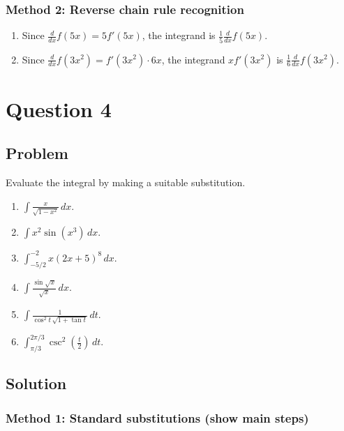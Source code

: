 \documentclass[12pt]{article}
\begin{document}
\subsubsection*{Method 2: Reverse chain rule recognition}

\begin{enumerate}[label=(\roman*)]
\item Since \(\frac{d}{dx}f(5x)=5f'(5x)\), the integrand is \(\frac{1}{5}\frac{d}{dx}f(5x)\).

\item Since \(\frac{d}{dx}f(3x^2)=f'(3x^2)\cdot 6x\), the integrand \(x f'(3x^2)\) is \(\frac{1}{6}\frac{d}{dx}f(3x^2)\).
\end{enumerate}

\bigskip


\newpage

\section*{Question 4}

\subsection*{Problem}

Evaluate the integral by making a suitable substitution.
\begin{enumerate}[label=(\roman*)]
\item \(\displaystyle \int \frac{x}{\sqrt{1-x^2}}\,dx.\)
\item \(\displaystyle \int x^2\sin(x^3)\,dx.\)
\item \(\displaystyle \int_{-5/2}^{-2} x(2x+5)^8\,dx.\)
\item \(\displaystyle \int \frac{\sin\sqrt{x}}{\sqrt{x}}\,dx.\)
\item \(\displaystyle \int \frac{1}{\cos^2 t\,\sqrt{1+\tan t}}\,dt.\)
\item \(\displaystyle \int_{\pi/3}^{2\pi/3}\csc^2\!\left(\frac{t}{2}\right)\,dt.\)
\end{enumerate}

\subsection*{Solution}

\subsubsection*{Method 1: Standard substitutions (show main steps)}
\end{document}
